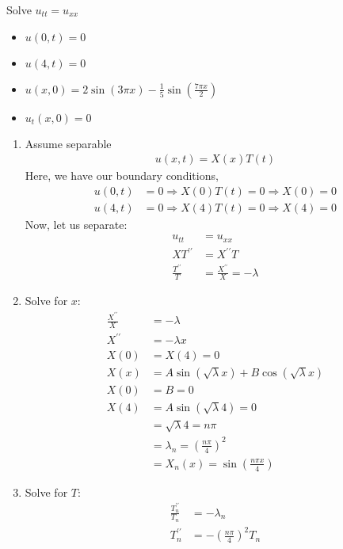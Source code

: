 \ex Solve $u_{tt} = u_{xx}$
\begin{itemize}
  \item $u(0, t)   = 0 $
  \item $u(4, t)   = 0 $
  \item $u(x, 0)   = 2 \sin(3 \pi x) - \frac{1}{5} \sin\left( \frac{7 \pi x}{2} \right)$
  \item $u_t(x, 0) = 0$
\end{itemize}
\begin{enumerate}
  \item Assume separable
  \begin{align}
    u(x, t) = X(x)T(t)
  \end{align}
  Here, we have our boundary conditions,
  \begin{align}
    u(0, t) & = 0 \Rightarrow X(0)T(t) = 0 \Rightarrow X(0) = 0\\
    u(4, t) & = 0 \Rightarrow X(4)T(t) = 0 \Rightarrow X(4) = 0
  \end{align}
  Now, let us separate:
  \begin{align}
    u_{tt} & = u_{xx}\\
    XT^{\prime\prime} & = X^{\prime\prime}T\\
    \frac{T^{\prime\prime}}{T} & = \frac{X^{\prime\prime}}{X} = -\lambda
  \end{align}
  \item Solve for $x$:
  \begin{align}
    \frac{X^{\prime\prime}}{X} & = - \lambda\\
    X^{\prime\prime} & = -\lambda x\\
    X(0) & = X(4) = 0\\
    X(x) & = A \sin(\sqrt \lambda x) + B \cos (\sqrt \lambda x)\\
    X(0) & = B = 0\\
    X(4) & = A \sin(\sqrt \lambda 4) = 0\\
    & = \sqrt \lambda 4 = n \pi\\
    & = \lambda_n = \left( \frac{n \pi}{4} \right)^2\\
    & = X_n(x) = \sin\left( \frac{n \pi x}{4}\right)
  \end{align}
  \item Solve for $T$:
  \begin{align}
    \frac{T^{\prime\prime}_n}{T_n} & = - \lambda_n\\
    T^{\prime\prime}_n & = - \left( \frac{n \pi}{4} \right)^2 T_n
  \end{align}

\end{enumerate}
